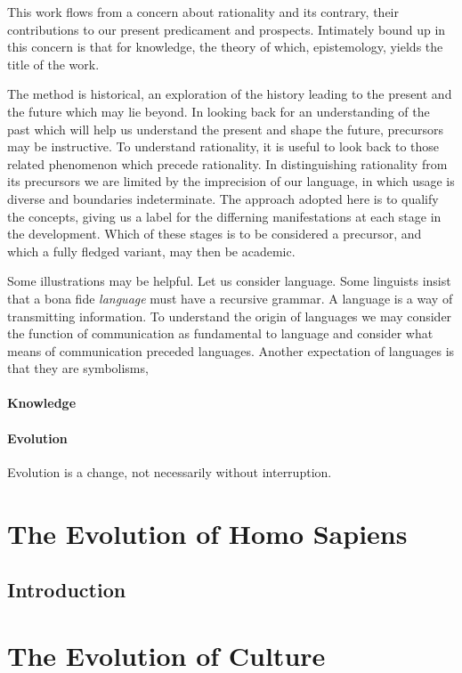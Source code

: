 \documentclass[10pt,titlepage]{book}
\begin{document}
This work flows from a concern about rationality and its contrary, their contributions to our present predicament and prospects.
Intimately bound up in this concern is that for knowledge, the theory of which, epistemology, yields the title of the work.

The method is historical, an exploration of the history leading to the present and the future which may lie beyond.
In looking back for an understanding of the past which will help us understand the present and shape the future, precursors may be instructive.
To understand rationality, it is useful to look back to those related phenomenon which precede rationality.
In distinguishing rationality from its precursors we are limited by the imprecision of our language, in which usage is diverse and boundaries indeterminate.
The approach adopted here is to qualify the concepts, giving us a label for the differning manifestations at each stage in the development.
Which of these stages is to be considered a precursor, and which a fully fledged variant, may then be academic.

Some illustrations may be helpful.
Let us consider language.
Some linguists insist that a bona fide \emph{language} must have a recursive grammar.
A language is a way of transmitting information.
To understand the origin of languages we may consider the function of communication as fundamental to language and consider what means of communication preceded languages.
Another expectation of languages is that they are symbolisms, 

\subsection{Knowledge}

\subsection{Evolution}

Evolution is a change, not necessarily without interruption.

\part{The Evolution of Homo Sapiens}

\chapter{Introduction}

\part{The Evolution of Culture}
\end{document}
